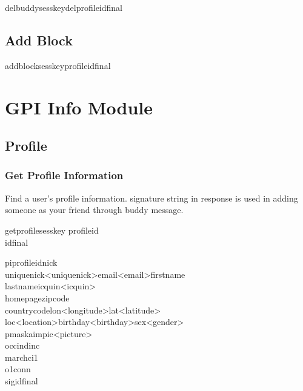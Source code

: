\documentclass[oneside,titlepage,a4paper]{Definition/retrospy} %
\begin{document}
\ClientRequest

\begin{mybox}
	\tbs delbuddy\tbs\tbs sesskey\tbs <session key>\tbs delprofileid\tbs <profile id>\tbs final\tbs
\end{mybox}

\subsection{Add Block}

\ClientRequest
\begin{mybox}
	\tbs addblock\tbs\tbs sesskey\tbs <session key>\tbs profileid\tbs <profile id>\tbs final\tbs
\end{mybox}



\section{GPI Info Module}
\subsection{Profile}
\subsubsection{Get Profile Information}
Find a user's profile information. signature string in response is used in adding someone as your friend through buddy message.
\ClientRequest

\begin{mybox}
	\tbs getprofile\tbs\tbs sesskey\tbs <session key>
	\tbs profileid\tbs <profile id>\\\tbs id\tbs <operation id>\tbs final\tbs
\end{mybox}
\ServerResponse

\begin{mybox}
	\tbs pi\tbs\tbs profileid\tbs <profile id>\tbs nick\tbs <nick name>\\\tbs uniquenick\tbs <uniquenick>\tbs email\tbs<email>\tbs firstname\tbs<first name>\\
	\tbs lastname\tbs <last name>\tbs icquin\tbs<icquin>\\
	\tbs homepage\tbs<home page URL>\tbs zipcode\tbs<zip code>\\
	\tbs countrycode\tbs<country code>\tbs lon\tbs <longitude>\tbs lat\tbs<latitude>\\
	\tbs loc\tbs<location>\tbs birthday\tbs<birthday>\tbs sex\tbs<gender>\\
	\tbs pmask\tbs<public mask>\tbs aim\tbs<aim name>\tbs pic\tbs <picture>\\
	\tbs occ\tbs<occupation id>\tbs ind\tbs<industry id>\tbs inc\tbs<income id>\\
	\tbs mar\tbs<married id>\tbs chc\tbs<child count number>\tbs i1\tbs<interest 1>\\
	\tbs  o1\tbs<ownership 1>\tbs conn\tbs<connection type id>\\
	\tbs sig\tbs<peer to peer signature>\tbs id\tbs <operation id>\tbs final\tbs
\end{mybox}
\end{document}

